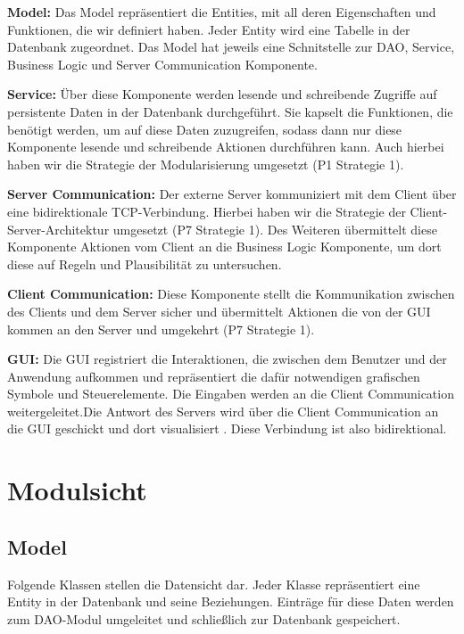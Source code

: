 \documentclass[fontsize=12pt,paper=a4,twoside]{scrartcl}
\begin{document}
\textbf{Model:}
Das Model repräsentiert die Entities, mit all deren Eigenschaften und Funktionen, die wir definiert haben. Jeder Entity wird eine Tabelle in der Datenbank zugeordnet. Das Model hat jeweils eine Schnitstelle zur DAO, Service, Business Logic und Server Communication Komponente.

\textbf{Service:} Über diese Komponente werden lesende und schreibende Zugriffe auf persistente Daten in der Datenbank durchgeführt. Sie kapselt die Funktionen, die benötigt werden, um auf diese Daten zuzugreifen, sodass dann nur diese Komponente lesende und schreibende Aktionen durchführen kann. Auch hierbei haben wir die Strategie der Modularisierung umgesetzt (P1 Strategie 1).

\textbf{Server Communication:} Der externe Server kommuniziert mit dem Client über eine bidirektionale TCP-Verbindung. Hierbei haben wir die Strategie der Client-Server-Architektur umgesetzt (P7 Strategie 1). Des Weiteren übermittelt diese Komponente Aktionen vom Client an die Business Logic Komponente, um dort diese auf Regeln und Plausibilität zu untersuchen.

\textbf{Client Communication:} Diese Komponente stellt die Kommunikation zwischen des Clients und dem Server sicher und übermittelt Aktionen die von der GUI kommen an den Server und umgekehrt (P7 Strategie 1).

\textbf{GUI:}
Die GUI registriert die Interaktionen, die zwischen dem Benutzer und der Anwendung aufkommen und repräsentiert die dafür notwendigen grafischen Symbole und
Steuerelemente. Die Eingaben werden an die Client Communication weitergeleitet.Die Antwort des Servers wird über die Client Communication an die GUI geschickt und dort visualisiert . Diese Verbindung ist also bidirektional.


\section{Modulsicht} \label{sec:modulsicht}
\subsection{Model}
Folgende Klassen stellen die Datensicht dar. Jeder Klasse repräsentiert eine Entity in der Datenbank und seine Beziehungen. Einträge für diese Daten werden zum DAO-Modul umgeleitet und schließlich zur Datenbank gespeichert.
\end{document}
